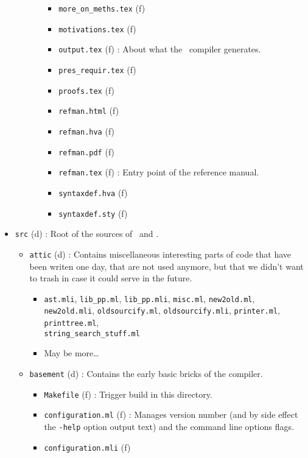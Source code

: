 \begin{itemize}
\begin{itemize}
\begin{itemize}
\begin{itemize}
      \item {\tt more\_on\_meths.tex} (f)
      \item {\tt motivations.tex} (f)
      \item {\tt output.tex} (f) : About what the \focalizec\ compiler
        generates.
      \item {\tt pres\_requir.tex} (f)
      \item {\tt proofs.tex} (f)
      \item {\tt refman.html} (f)
      \item {\tt refman.hva} (f)
      \item {\tt refman.pdf} (f)
      \item {\tt refman.tex} (f) : Entry point of the reference manual.
      \item {\tt syntaxdef.hva} (f)
      \item {\tt syntaxdef.sty} (f)
      \end{itemize}
    \end{itemize}
  \end{itemize}
\item {\tt src} (d) : Root of the sources of \focalizec\ and \focalizedep.
  \begin{itemize}
  \item {\tt attic} (d) : Contains miscellaneous interesting parts of
    code that have been writen one day, that are not used anymore, but
    that we didn't want to trash in case it could serve in the future.
    \begin{itemize}
    \item {\tt ast.mli}, {\tt lib\_pp.ml}, {\tt lib\_pp.mli},
      {\tt misc.ml}, {\tt new2old.ml}, {\tt new2old.mli},
      {\tt oldsourcify.ml}, {\tt oldsourcify.mli},
      {\tt printer.ml}, {\tt printtree.ml},\\
      {\tt string\_search\_stuff.ml}
    \item May be more\ldots
    \end{itemize}
    \item {\tt basement} (d) : Contains the early basic bricks of the
      compiler.
      \begin{itemize}
        \item {\tt Makefile} (f) : Trigger build in this directory.
        \item {\tt configuration.ml} (f) : Manages version number (and
          by side effect the {\tt -help} option output text) and the
          command line options flags.
        \item {\tt configuration.mli} (f)

\end{itemize}
\end{itemize}
\end{itemize}
